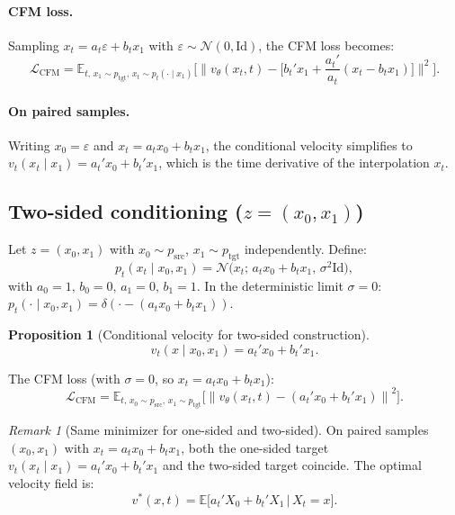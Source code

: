 \documentclass[11pt]{article}
\newcommand{\E}{\mathbb{E}}
\newcommand{\cN}{\mathcal{N}}
\newcommand{\Id}{\mathrm{Id}}
\newcommand{\norm}[1]{\left\lVert #1 \right\rVert}
\newtheorem{proposition}[theorem]{Proposition}
\theoremstyle{definition}
\theoremstyle{remark}
\newtheorem{remark}[theorem]{Remark}
\begin{document}
\paragraph{CFM loss.}
Sampling $x_t = a_t\varepsilon + b_t x_1$ with $\varepsilon\sim\cN(0,\Id)$, the CFM loss becomes:
\begin{equation}\label{eq:one-sided-cfm}
\mathcal{L}_{\mathrm{CFM}} = \E_{t,\,x_1\sim p_{\mathrm{tgt}},\,x_t\sim p_t(\cdot\mid x_1)}\!\bigg[\bigg\|v_\theta(x_t,t) - \Big[b_t' x_1 + \frac{a_t'}{a_t}(x_t - b_t x_1)\Big]\bigg\|^2\bigg].
\end{equation}

\paragraph{On paired samples.}
Writing $x_0 = \varepsilon$ and $x_t = a_t x_0 + b_t x_1$, the conditional velocity simplifies to $v_t(x_t\mid x_1) = a_t' x_0 + b_t' x_1$, which is the time derivative of the interpolation $x_t$.

\subsection{Two-sided conditioning ($z = (x_0, x_1)$)}

Let $z = (x_0, x_1)$ with $x_0\sim p_{\mathrm{src}}$, $x_1\sim p_{\mathrm{tgt}}$ independently.
Define:
\begin{equation}\label{eq:two-sided-path}
p_t(x_t\mid x_0, x_1) = \cN\!\big(x_t;\,a_t x_0 + b_t x_1,\,\sigma^2 \Id\big),
\end{equation}
with $a_0=1,\,b_0=0,\,a_1=0,\,b_1=1$.
In the deterministic limit $\sigma=0$: $p_t(\cdot\mid x_0,x_1) = \delta(\cdot - (a_t x_0 + b_t x_1))$.

\begin{proposition}[Conditional velocity for two-sided construction]
\begin{equation}\label{eq:two-sided-vf}
v_t(x\mid x_0,x_1) = a_t' x_0 + b_t' x_1.
\end{equation}
\end{proposition}

The CFM loss (with $\sigma=0$, so $x_t = a_t x_0 + b_t x_1$):
\[
\mathcal{L}_{\mathrm{CFM}} = \E_{t,\,x_0\sim p_{\mathrm{src}},\,x_1\sim p_{\mathrm{tgt}}}\!\big[\norm{v_\theta(x_t,t) - (a_t' x_0 + b_t' x_1)}^2\big].
\]

\begin{remark}[Same minimizer for one-sided and two-sided]
On paired samples $(x_0, x_1)$ with $x_t = a_t x_0 + b_t x_1$, both the one-sided target $v_t(x_t\mid x_1) = a_t' x_0 + b_t' x_1$ and the two-sided target coincide.
The optimal velocity field is:
\[
v^*(x,t) = \E\!\big[a_t' X_0 + b_t' X_1\,\big|\,X_t = x\big].
\]
\end{remark}
\end{document}
